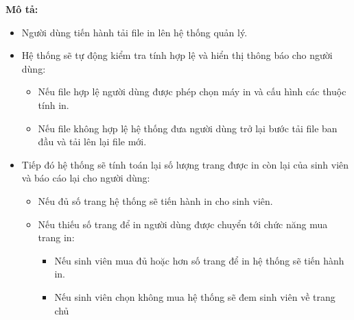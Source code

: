     \newpage
    \textbf{Mô tả:}
    \begin{itemize}
        \item Người dùng tiến hành tải file in lên hệ thống quản lý.
        \item Hệ thống sẽ tự động kiểm tra tính hợp lệ và hiển thị thông báo cho người dùng:
        \begin{itemize}
            \item Nếu file hợp lệ người dùng được phép chọn máy in và cấu hình các thuộc tính in.
            \item Nếu file không hợp lệ hệ thống đưa người dùng trở lại bước tải file ban đầu và tải lên lại file mới.
        \end{itemize}
        \item Tiếp đó hệ thống sẽ tính toán lại số lượng trang được in còn lại của sinh viên và báo cáo lại cho người dùng:
        \begin{itemize}
            \item Nếu đủ số trang hệ thống sẽ tiến hành in cho sinh viên.
            \item Nếu thiếu số trang để in người dùng được chuyển tới chức năng mua trang in:
            \begin{itemize}
                \item Nếu sinh viên mua đủ hoặc hơn số trang để in hệ thống sẽ tiến hành in.
                \item Nếu sinh viên chọn không mua hệ thống sẽ đem sinh viên về trang chủ
            \end{itemize}
        \end{itemize}
    \end{itemize}

    \newpage
